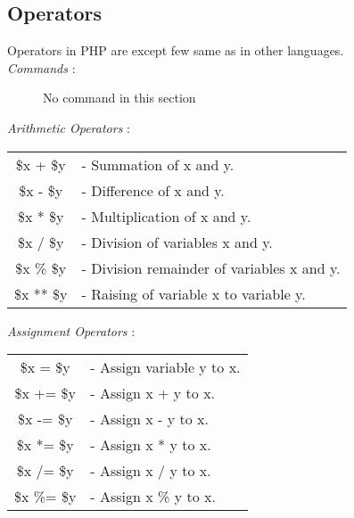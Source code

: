 \documentclass{article}
\begin{document}
\subsection{Operators}
Operators in PHP are except few same as in other languages.\\
\textit{Commands} : 
\begin{description}
\item[\hspace{1cm}] No command in this section
\end{description}
\textit{Arithmetic Operators} : \\
\begin{tabular}{c l}
\hspace{1cm} \$x + \$y & - Summation of x and y. \\
\hspace{1cm} \$x - \$y & - Difference of x and y. \\
\hspace{1cm} \$x * \$y & - Multiplication of x and y. \\
\hspace{1cm} \$x / \$y & - Division of variables x and y.\\
\hspace{1cm} \$x \% \$y & - Division remainder of variables x and y.\\
\hspace{1cm} \$x ** \$y & - Raising of variable x to variable y.\\
\end{tabular}
\vspace{0.5cm}
\hfill\newline
\textit{Assignment Operators} : \\
\begin{tabular}{c l}
\hspace{1cm} \$x = \$y & - Assign variable y to x. \\
\hspace{1cm} \$x += \$y & - Assign x + y to x. \\
\hspace{1cm} \$x -= \$y & - Assign x - y to x. \\
\hspace{1cm} \$x *= \$y & - Assign x * y to x.\\
\hspace{1cm} \$x /= \$y & - Assign x / y to x.\\
\hspace{1cm} \$x \%= \$y & - Assign x \% y to x.\\
\end{tabular}
\end{document}
